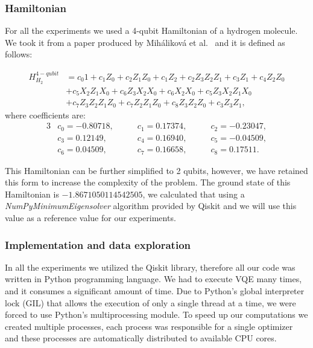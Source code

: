 \subsubsection{Hamiltonian}
For all the experiments we used a 4-qubit Hamiltonian of a hydrogen molecule. We took it from a paper produced by Miháliková et al.~\cite{mihalikova} and it is defined as follows:

\begin{align*}H_{H_2}^{4-qubit} &= c_{0}1 + c_{1}Z_{0} + c_{2}Z_{1}Z_{0} + c_{1}Z_{2} + c_{2}Z_{3}Z_{2}Z_{1} + c_{3}Z_{1} + c_{4}Z_{2}Z_{0}\\
                                &+ c_{5}X_{2}Z_{1}X_{0} + c_{6}Z_{3}X_{2}X_{0} + c_{6}X_{2}X_{0} + c_{5}Z_{3}X_{2}Z_{1}X_{0}\\
                                &+c_{7}Z_{3}Z_{2}Z_{1}Z_{0} + c_{7}Z_{2}Z_{1}Z_{0} + c_{8}Z_{3}Z_{2}Z_{0} + c_{3}Z_{3}Z_{1},
\end{align*}
where coefficients are:
\begin{alignat*}{3}
    &c_0 = -0.80718,\qquad &c_1 = 0.17374,\qquad &c_2 =-0.23047, \\
    &c_3 = 0.12149,\qquad  &c_4 = 0.16940,\qquad &c_5 = -0.04509, \\
    &c_6 = 0.04509,\qquad  &c_7 = 0.16658,\qquad &c_8 = 0.17511.
\end{alignat*}

This Hamiltonian can be further simplified to 2 qubits, however, we have retained this form to increase the complexity of the problem. The ground state of this Hamiltonian is $-1.8671050114542505$, we calculated that using a \textit{NumPyMinimumEigensolver} algorithm provided by Qiskit and we will use this value as a reference value for our experiments.

\subsubsection{Implementation and data exploration}
In all the experiments we utilized the Qiskit library, therefore all our code was written in Python programming language. We had to execute VQE many times, and it consumes a significant amount of time. Due to Python's global interpreter lock (GIL) that allows the execution of only a single thread at a time, we were forced to use Python's multiprocessing module. To speed up our computations we created multiple processes, each process was responsible for a single optimizer and these processes are automatically distributed to available CPU cores.

